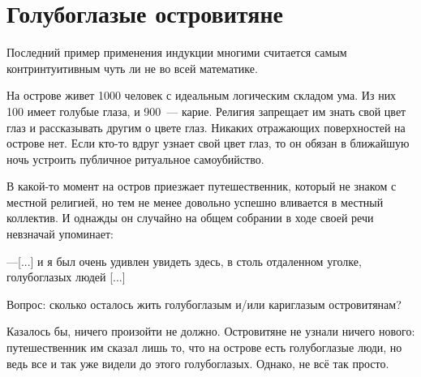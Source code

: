 \section{Голубоглазые островитяне}

Последний пример применения индукции многими считается самым контринтуитивным чуть ли не во всей математике.

\begin{example}
   На острове живет 1000 человек с идеальным логическим складом ума. Из них 100 имеет голубые глаза, и 900~--- карие. Религия запрещает им знать свой цвет глаз и рассказывать другим о цвете глаз. Никаких отражающих поверхностей на острове нет. Если кто-то вдруг узнает свой цвет глаз, то он обязан в ближайшую ночь устроить публичное ритуальное самоубийство.

    В какой-то момент на остров приезжает путешественник, который не знаком с местной религией, но тем не менее довольно успешно вливается в местный коллектив. И однажды он случайно на общем собрании в ходе своей речи невзначай упоминает:

    ---[...] и я был очень удивлен увидеть здесь, в столь отдаленном уголке, голубоглазых людей [...]

    Вопрос: сколько осталось жить голубоглазым и/или кариглазым островитянам?
\end{example}

Казалось бы, ничего произойти не должно. Островитяне не узнали ничего нового: путешественник им сказал лишь то, что на острове есть голубоглазые люди, но ведь все и так уже видели до этого голубоглазых. Однако, не всё так просто.


